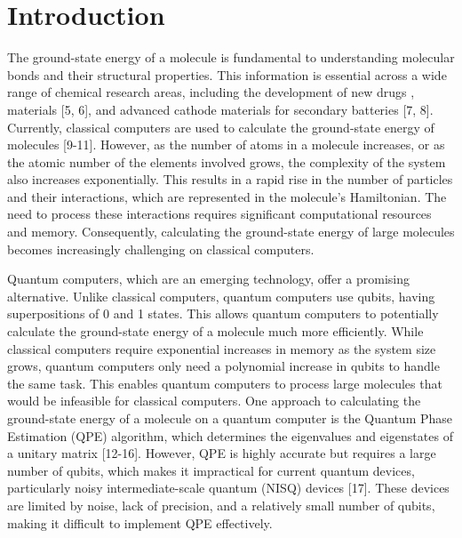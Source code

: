 \documentclass[pdflatex,sn-mathphys-num]{sn-jnl}%
\theoremstyle{thmstyleone}%
\theoremstyle{thmstyletwo}%
\theoremstyle{thmstylethree}%
\begin{document}
\section{Introduction}\label{sec1}

The ground-state energy of a molecule is fundamental to understanding molecular bonds and their structural properties. 
This information is essential across a wide range of chemical research areas, including the development of new drugs \cite{RN50}, materials [5, 6], and advanced cathode materials for secondary batteries [7, 8]. 
Currently, classical computers are used to calculate the ground-state energy of molecules [9-11].
However, as the number of atoms in a molecule increases, or as the atomic number of the elements involved grows, the complexity of the system also increases exponentially.
This results in a rapid rise in the number of particles and their interactions, which are represented in the molecule’s Hamiltonian. 
The need to process these interactions requires significant computational resources and memory. 
Consequently, calculating the ground-state energy of large molecules becomes increasingly challenging on classical computers.

Quantum computers, which are an emerging technology, offer a promising alternative. Unlike classical computers, quantum computers use qubits, having superpositions of  0 and 1 states. 
This allows quantum computers to potentially calculate the ground-state energy of a molecule much more efficiently. 
While classical computers require exponential increases in memory as the system size grows, quantum computers only need a polynomial increase in qubits to handle the same task. 
This enables quantum computers to process large molecules that would be infeasible for classical computers.
One approach to calculating the ground-state energy of a molecule on a quantum computer is the Quantum Phase Estimation (QPE) algorithm, which determines the eigenvalues and eigenstates of a unitary matrix [12-16]. 
However, QPE is highly accurate but requires a large number of qubits, which makes it impractical for current quantum devices, particularly noisy intermediate-scale quantum (NISQ) devices [17]. 
These devices are limited by noise, lack of precision, and a relatively small number of qubits, making it difficult to implement QPE effectively.
\end{document}

